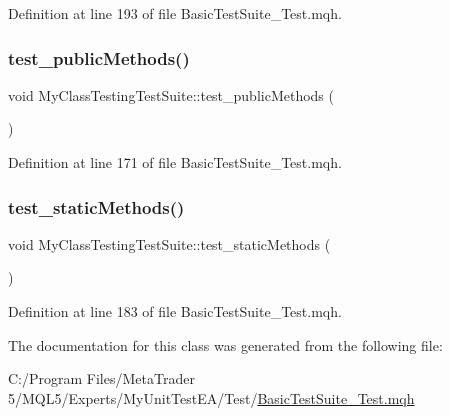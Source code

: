 Definition at line 193 of file Basic\+Test\+Suite\+\_\+\+Test.\+mqh.

\mbox{\label{class_my_class_testing_test_suite_a2f8139a2e71068665e18f99781358111}} 
\subsubsection{\texorpdfstring{test\+\_\+public\+Methods()}{test\_publicMethods()}}
{\footnotesize\ttfamily void My\+Class\+Testing\+Test\+Suite\+::test\+\_\+public\+Methods (\begin{DoxyParamCaption}{ }\end{DoxyParamCaption})\hspace{0.3cm}{\ttfamily [inline]}}



Definition at line 171 of file Basic\+Test\+Suite\+\_\+\+Test.\+mqh.

\mbox{\label{class_my_class_testing_test_suite_aadb56765b805c6dadcb2fb6d3c607e27}} 
\subsubsection{\texorpdfstring{test\+\_\+static\+Methods()}{test\_staticMethods()}}
{\footnotesize\ttfamily void My\+Class\+Testing\+Test\+Suite\+::test\+\_\+static\+Methods (\begin{DoxyParamCaption}{ }\end{DoxyParamCaption})\hspace{0.3cm}{\ttfamily [inline]}}



Definition at line 183 of file Basic\+Test\+Suite\+\_\+\+Test.\+mqh.



The documentation for this class was generated from the following file\+:\begin{DoxyCompactItemize}
\item 
C\+:/\+Program Files/\+Meta\+Trader 5/\+M\+Q\+L5/\+Experts/\+My\+Unit\+Test\+E\+A/\+Test/\mbox{\hyperlink{_basic_test_suite___test_8mqh}{Basic\+Test\+Suite\+\_\+\+Test.\+mqh}}\end{DoxyCompactItemize}
